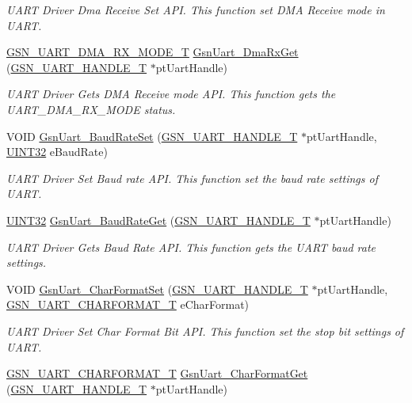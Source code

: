 \begin{DoxyCompactItemize}
\begin{DoxyCompactList}\small\item\em UART Driver Dma Receive Set API. This function set DMA Receive mode in UART. \end{DoxyCompactList}\item 
\hyperlink{a00656_ga14b3640ffe5cd4028623beae5472da4a}{GSN\_\-UART\_\-DMA\_\-RX\_\-MODE\_\-T} \hyperlink{a00656_ga18dd0cc9f8cf76bbce0889ed412691a3}{GsnUart\_\-DmaRxGet} (\hyperlink{a00266}{GSN\_\-UART\_\-HANDLE\_\-T} $\ast$ptUartHandle)
\begin{DoxyCompactList}\small\item\em UART Driver Gets DMA Receive mode API. This function gets the UART\_\-DMA\_\-RX\_\-MODE status. \end{DoxyCompactList}\item 
VOID \hyperlink{a00656_ga1c8bfb967aee8f7d60b6ba5917fef54f}{GsnUart\_\-BaudRateSet} (\hyperlink{a00266}{GSN\_\-UART\_\-HANDLE\_\-T} $\ast$ptUartHandle, \hyperlink{a00660_gae1e6edbbc26d6fbc71a90190d0266018}{UINT32} eBaudRate)
\begin{DoxyCompactList}\small\item\em UART Driver Set Baud rate API. This function set the baud rate settings of UART. \end{DoxyCompactList}\item 
\hyperlink{a00660_gae1e6edbbc26d6fbc71a90190d0266018}{UINT32} \hyperlink{a00656_ga7f5c8a333e4eb2de06f97625cef471ef}{GsnUart\_\-BaudRateGet} (\hyperlink{a00266}{GSN\_\-UART\_\-HANDLE\_\-T} $\ast$ptUartHandle)
\begin{DoxyCompactList}\small\item\em UART Driver Gets Baud Rate API. This function gets the UART baud rate settings. \end{DoxyCompactList}\item 
VOID \hyperlink{a00656_ga9568fde8552d93218dfa1968ea060ca4}{GsnUart\_\-CharFormatSet} (\hyperlink{a00266}{GSN\_\-UART\_\-HANDLE\_\-T} $\ast$ptUartHandle, \hyperlink{a00656_gaf208b91b10fde1d137e4ec8a7dde641b}{GSN\_\-UART\_\-CHARFORMAT\_\-T} eCharFormat)
\begin{DoxyCompactList}\small\item\em UART Driver Set Char Format Bit API. This function set the stop bit settings of UART. \end{DoxyCompactList}\item 
\hyperlink{a00656_gaf208b91b10fde1d137e4ec8a7dde641b}{GSN\_\-UART\_\-CHARFORMAT\_\-T} \hyperlink{a00656_ga75d819e60ca33c8862d24eda5af9c9c1}{GsnUart\_\-CharFormatGet} (\hyperlink{a00266}{GSN\_\-UART\_\-HANDLE\_\-T} $\ast$ptUartHandle)

\end{DoxyCompactItemize}
